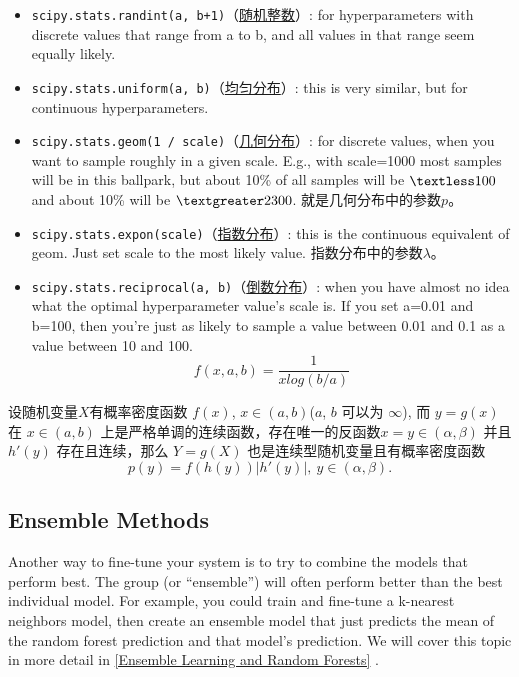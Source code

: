 \begin{itemize}
    \item \verb|scipy.stats.randint(a, b+1)|（\href{https://docs.scipy.org/doc/scipy/reference/generated/scipy.stats.randint.html}{随机整数}）: for hyperparameters with discrete values that range from a to b, and all values in that range seem equally likely.
    \item \verb|scipy.stats.uniform(a, b)|（\href{https://docs.scipy.org/doc/scipy/reference/generated/scipy.stats.uniform.html}{均匀分布}）: this is very similar, but for continuous hyperparameters.
    \item \verb|scipy.stats.geom(1 / scale)|（\href{https://docs.scipy.org/doc/scipy/reference/generated/scipy.stats.geom.html}{几何分布}）: for discrete values, when you want to sample roughly in a given scale. E.g., with scale=1000 most samples will be in this ballpark, but about 10\% of all samples will be $\textless 100$ and about 10\% will be $\textgreater 2300$. 就是几何分布中的参数$p$。
    \item \verb|scipy.stats.expon(scale)|（\href{https://docs.scipy.org/doc/scipy/reference/generated/scipy.stats.expon.html}{指数分布}）: this is the continuous equivalent of geom. Just set scale to the most likely value. 指数分布中的参数$\lambda$。
    \item \verb|scipy.stats.reciprocal(a, b)|（\href{https://docs.scipy.org/doc//scipy-1.3.2/reference/generated/scipy.stats.reciprocal.html}{倒数分布}）: when you have almost no idea what the optimal hyperparameter value's scale is. If you set a=0.01 and b=100, then you're just as likely to sample a value between 0.01 and 0.1 as a value between 10 and 100.
    $$f(x, a, b)=\frac{1}{xlog(b/a)}$$
\end{itemize}
\begin{theorem}[密度变换公式]
    设随机变量$X$有概率密度函数 $f(x)$, $x \in (a, b)$($a$, $b$ 可以为 $\infty$), 而 $y = g(x)$ 在 $x \in (a, b)$ 上是严格单调的连续函数，存在唯一的反函数$x =  y \in (\alpha, \beta)$ 并且 $h'(y)$ 存在且连续，那么 $Y = g(X)$ 也是连续型随机变量且有概率密度函数
    $$p(y)=f(h(y))|h'(y)|, ~ y \in (\alpha, \beta).$$  
\end{theorem}

\subsection{Ensemble Methods}
Another way to fine-tune your system is to try to combine the models that perform
best. The group (or ``ensemble”) will often perform better than the best individual
model. For example, you could train and fine-tune a k-nearest neighbors model, then create
an ensemble model that just predicts the mean of the random forest prediction and
that model's prediction. We will cover this topic in more detail in \autoref{Ensemble Learning and Random Forests} .

